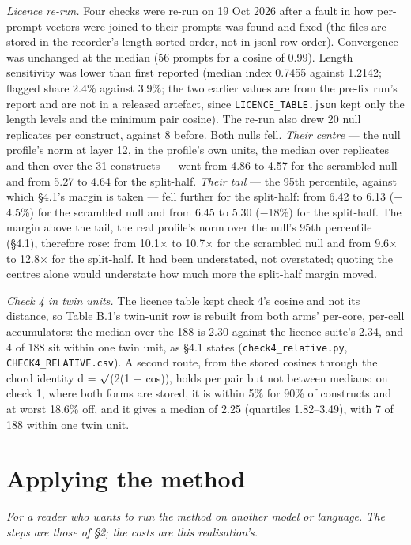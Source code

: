 \documentclass{article}
\begin{document}
\emph{Licence re-run.} Four checks were re-run on 19 Oct 2026 after a fault in how per-prompt vectors were joined to their prompts was found and fixed (the files are stored in the recorder's length-sorted order, not in jsonl row order). Convergence was unchanged at the median (56 prompts for a cosine of 0.99). Length sensitivity was lower than first reported (median index 0.7455 against 1.2142; flagged share 2.4\% against 3.9\%; the two earlier values are from the pre-fix run's report and are not in a released artefact, since \texttt{LICENCE\_TABLE.json} kept only the length levels and the minimum pair cosine). The re-run also drew 20 null replicates per construct, against 8 before. Both nulls fell. \emph{Their centre} --- the null profile's norm at layer 12, in the profile's own units, the median over replicates and then over the 31 constructs --- went from 4.86 to 4.57 for the scrambled null and from 5.27 to 4.64 for the split-half. \emph{Their tail} --- the 95th percentile, against which \S4.1's margin is taken --- fell further for the split-half: from 6.42 to 6.13 ($-$4.5\%) for the scrambled null and from 6.45 to 5.30 ($-$18\%) for the split-half. The margin above the tail, the real profile's norm over the null's 95th percentile (\S4.1), therefore rose: from 10.1$\times$ to 10.7$\times$ for the scrambled null and from 9.6$\times$ to 12.8$\times$ for the split-half. It had been understated, not overstated; quoting the centres alone would understate how much more the split-half margin moved.

\emph{Check 4 in twin units.} The licence table kept check 4's cosine and not its distance, so Table B.1's twin-unit row is rebuilt from both arms' per-core, per-cell accumulators: the median over the 188 is 2.30 against the licence suite's 2.34, and 4 of 188 sit within one twin unit, as \S4.1 states (\texttt{check4\_relative.py}, \texttt{CHECK4\_RELATIVE.csv}). A second route, from the stored cosines through the chord identity d = $\surd$(2(1 $-$ cos)), holds per pair but not between medians: on check 1, where both forms are stored, it is within 5\% for 90\% of constructs and at worst 18.6\% off, and it gives a median of 2.25 (quartiles 1.82--3.49), with 7 of 188 within one twin unit.


\section{Applying the method}

\emph{For a reader who wants to run the method on another model or language. The steps are those of \S2; the costs are this realisation's.}
\end{document}
